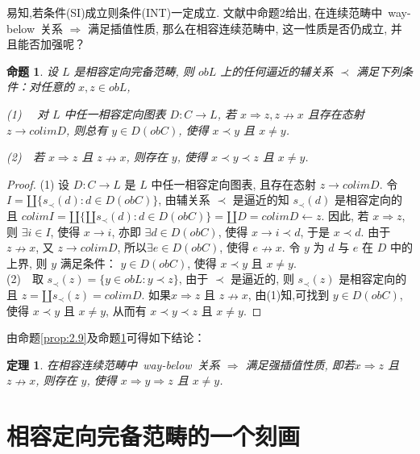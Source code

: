 \documentclass[c5size,a4paper,hyperref,fancyhdr,UTF8]{ctexart}
\theoremstyle{nonumberplain}
\newtheorem{proof}{证明}
\newtheorem{theorem}[definition]{定理}
\newtheorem{proposition}[definition]{命题}
\theoremstyle{nonumberplain}
\newtheorem{proof}{证}
\begin{document}
易知,若条件(SI)成立则条件(INT)一定成立. 文献\cite{r4}中命题2给出, 在连续范畴中~way-below~关系 $\Rightarrow$ 满足插值性质, 那么在相容连续范畴中, 这一性质是否仍成立, 并且能否加强呢？

\begin{proposition}\label{prop:2.10}
  设 $L$ 是相容定向完备范畴, 则 $obL$ 上的任何逼近的辅关系 $\prec$ 满足下列条件：对任意的 $x,z\in obL$, \par(1)~~ 对 $L$ 中任一相容定向图表 $D:C\rightarrow L$, 若 $x\Rightarrow z, z\nrightarrow x$ 且存在态射 $z\rightarrow colim D$, 则总有 $y\in D(obC)$, 使得 $x\prec y$ 且 $x\neq y$.
  \par(2)~~若 $x\Rightarrow z$ 且 $z\nrightarrow x$, 则存在 $y$, 使得 $x\prec y\prec z$ 且 $x\neq y$.
\end{proposition}

\begin{proof}
  (1) 设 $D:C\rightarrow L$ 是 $L$ 中任一相容定向图表, 且存在态射 $z\rightarrow colim D$. 令 $I=\amalg\{s_{\prec}(d):d\in D(obC)\}$, 由辅关系 $\prec$ 是逼近的知 $s_{\prec}(d)$ 是相容定向的且 $colim I=\amalg\{\amalg s_{\prec}(d):d\in D(obC)\}=\amalg D=colim D\leftarrow z$. 因此, 若 $x\Rightarrow z$, 则 $\exists i\in I$, 使得 $x\rightarrow i$, 亦即 $\exists d\in D(obC)$, 使得 $x\rightarrow i\prec d$, 于是 $x\prec d$. 由于 $z\nrightarrow x$, 又 $z\rightarrow colim D$, 所以$\exists e\in D(obC)$, 使得  $e\nrightarrow x$. 令 $y$ 为 $d$ 与 $e$ 在 $D$ 中的上界, 则 $y$ 满足条件： $y\in D(obC)$, 使得 $x\prec y$ 且 $x\neq y$.\\
  (2)~~取 $s_{\prec}(z)=\{y\in obL:y\prec z\}$, 由于 $\prec$ 是逼近的, 则 $s_{\prec}(z)$ 是相容定向的且 $z=\amalg s_{\prec}(z)=colim D$. 如果$x\Rightarrow z$ 且 $z\nrightarrow x$, 由(1)知,可找到 $y\in D(obC)$, 使得 $x\prec y$ 且 $x\neq y$, 从而有 $x\prec y\prec z$ 且 $x\neq y$.
\end{proof}

由命题\ref{prop:2.9}及命题\ref{prop:2.10}可得如下结论：

\begin{theorem}
  在相容连续范畴中~way-below~关系 $\Rightarrow$ 满足强插值性质, 即若$x\Rightarrow z$ 且
$z\nrightarrow x$, 则存在 $y$, 使得 $x\Rightarrow y\Rightarrow z$ 且 $x\neq y$.
\end{theorem}

\section{相容定向完备范畴的一个刻画}
\end{document}
